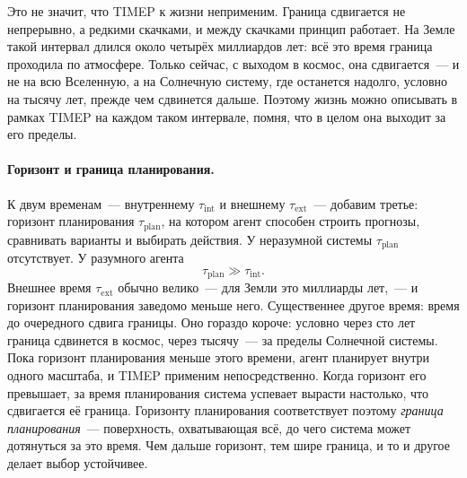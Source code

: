 \documentclass[11pt,a4paper]{article}
\begin{document}
Это не значит, что TIMEP к жизни неприменим. Граница сдвигается не непрерывно, а редкими скачками, и между скачками принцип работает. На Земле такой интервал длился около четырёх миллиардов лет: всё это время граница проходила по атмосфере. Только сейчас, с выходом в космос, она сдвигается~--- и не на всю Вселенную, а на Солнечную систему, где останется надолго, условно на тысячу лет, прежде чем сдвинется дальше. Поэтому жизнь можно описывать в рамках TIMEP на каждом таком интервале, помня, что в целом она выходит за его пределы.

\paragraph{Горизонт и граница планирования.}
К двум временам~--- внутреннему $\tau_{\mathrm{int}}$ и внешнему $\tau_{\mathrm{ext}}$~--- добавим третье: горизонт планирования $\tau_{\mathrm{plan}}$, на котором агент способен строить прогнозы, сравнивать варианты и выбирать действия. У неразумной системы $\tau_{\mathrm{plan}}$ отсутствует. У разумного агента
\begin{equation}
\tau_{\mathrm{plan}}\gg\tau_{\mathrm{int}} .
\end{equation}
Внешнее время $\tau_{\mathrm{ext}}$ обычно велико~--- для Земли это миллиарды лет,~--- и горизонт планирования заведомо меньше него. Существеннее другое время: время до очередного сдвига границы. Оно гораздо короче: условно через сто лет граница сдвинется в космос, через тысячу~--- за пределы Солнечной системы. Пока горизонт планирования меньше этого времени, агент планирует внутри одного масштаба, и TIMEP применим непосредственно. Когда горизонт его превышает, за время планирования система успевает вырасти настолько, что сдвигается её граница. Горизонту планирования соответствует поэтому \emph{граница планирования}~--- поверхность, охватывающая всё, до чего система может дотянуться за это время. Чем дальше горизонт, тем шире граница, и то и другое делает выбор устойчивее.
\end{document}
